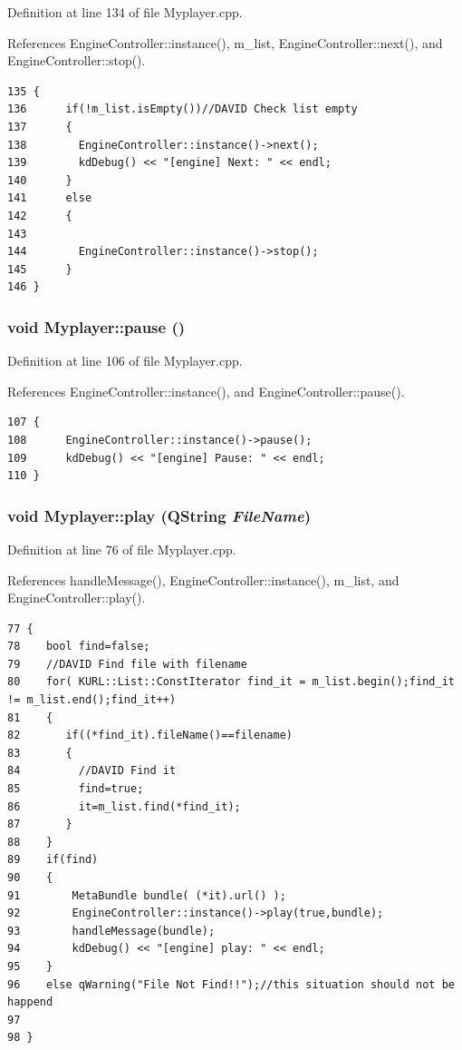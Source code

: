 Definition at line 134 of file Myplayer.cpp.

References Engine\-Controller::instance(), m\_\-list, Engine\-Controller::next(), and Engine\-Controller::stop().



\footnotesize\begin{verbatim}135 {
136      if(!m_list.isEmpty())//DAVID Check list empty
137      {
138        EngineController::instance()->next();
139        kdDebug() << "[engine] Next: " << endl;
140      }
141      else 
142      {
143      
144        EngineController::instance()->stop();
145      }
146 }
\end{verbatim}\normalsize 
{}
\subsubsection{\setlength{\rightskip}{0pt plus 5cm}void Myplayer::pause ()\hspace{0.3cm}{\tt  [slot]}}\label{classMyplayer_Myplayeri2}




Definition at line 106 of file Myplayer.cpp.

References Engine\-Controller::instance(), and Engine\-Controller::pause().



\footnotesize\begin{verbatim}107 {
108      EngineController::instance()->pause();
109      kdDebug() << "[engine] Pause: " << endl;
110 }
\end{verbatim}\normalsize 
{}
\subsubsection{\setlength{\rightskip}{0pt plus 5cm}void Myplayer::play (QString {\em File\-Name})\hspace{0.3cm}{\tt  [slot]}}\label{classMyplayer_Myplayeri1}




Definition at line 76 of file Myplayer.cpp.

References handle\-Message(), Engine\-Controller::instance(), m\_\-list, and Engine\-Controller::play().



\footnotesize\begin{verbatim}77 {
78    bool find=false;
79    //DAVID Find file with filename
80    for( KURL::List::ConstIterator find_it = m_list.begin();find_it != m_list.end();find_it++)
81    {
82       if((*find_it).fileName()==filename)
83       {
84         //DAVID Find it
85         find=true;
86         it=m_list.find(*find_it);
87       }
88    }
89    if(find)
90    {
91        MetaBundle bundle( (*it).url() );        
92        EngineController::instance()->play(true,bundle); 
93        handleMessage(bundle);
94        kdDebug() << "[engine] play: " << endl;            
95    }
96    else qWarning("File Not Find!!");//this situation should not be happend
97 
98 }
\end{verbatim}\normalsize 
{}
